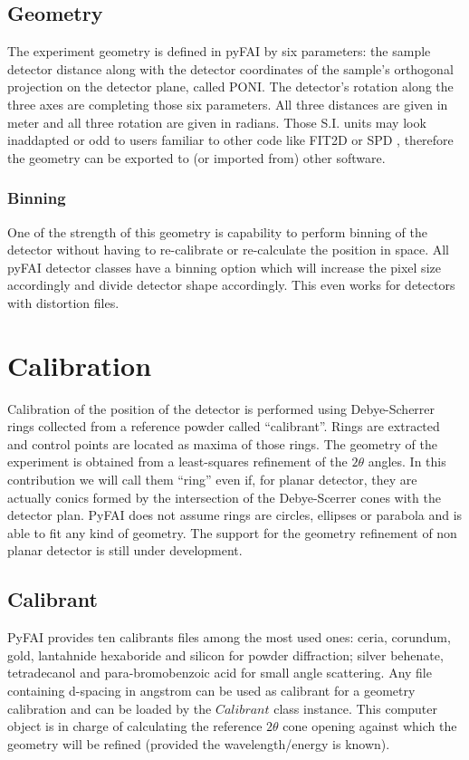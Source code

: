 \documentclass[preprint]{iucr}
\begin{document}
\subsection{Geometry}
The experiment geometry is defined in pyFAI by six parameters: the sample
detector distance along with the detector coordinates of the sample's orthogonal
projection on the detector plane, called PONI. 
The detector's rotation along the three axes are completing those six
parameters. 
All three distances are given in meter and all three rotation are given
in radians.
Those S.I. units may look inaddapted or odd to users familiar to other code
like FIT2D \cite{fit2d} or SPD \cite{spd}, therefore the geometry can be
exported to (or imported from) other software.

 
\subsubsection{Binning}
One of the strength of this geometry is capability to perform binning of the
detector without having to re-calibrate or re-calculate the position in space.
All pyFAI detector classes have a binning option which will increase the pixel
size accordingly and divide detector shape accordingly. 
This even works for detectors with distortion files. 

\section{Calibration}
Calibration of the position of the detector is performed using Debye-Scherrer
rings collected from a reference powder called ``calibrant''.
Rings are extracted and control points are located as maxima of those rings.
The geometry of the experiment is obtained from a least-squares refinement of
the $2\theta$ angles.
In this contribution we will call them ``ring'' even if, for planar detector,
they are actually conics formed by the intersection of the Debye-Scerrer cones
with the detector plan. 
PyFAI does not assume rings are circles, ellipses or parabola and is able to fit
any kind of geometry. The support for the geometry refinement of non planar
detector is still under development.

\subsection{Calibrant}
PyFAI provides ten calibrants files among the most used ones: ceria, corundum,
gold, lantahnide hexaboride and silicon for powder diffraction; silver behenate,
tetradecanol and para-bromobenzoic acid for small angle scattering.
Any file containing d-spacing in angstrom can be used as calibrant for a
geometry calibration and can be loaded by the $Calibrant$ class instance.
This computer object is in charge of
calculating the reference $2\theta$ cone opening 
against which the geometry will be refined (provided the wavelength/energy is
known).
\end{document}
